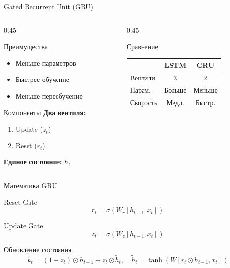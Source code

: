 \documentclass[aspectratio=169, 10pt]{beamer}
\begin{document}
\begin{frame}{Gated Recurrent Unit (GRU)}
  \begin{columns}[T]
    \begin{column}{0.45\textwidth}
      \begin{block}{Преимущества}
        \begin{itemize}
          \item Меньше параметров
          \item Быстрее обучение
          \item Меньше переобучение
        \end{itemize}
      \end{block}
      
      \vspace{0.2cm}
      
      \begin{block}{Компоненты}
        \textbf{Два вентиля:}
        \begin{enumerate}
          \item Update ($z_t$)
          \item Reset ($r_t$)
        \end{enumerate}
        
        \textbf{Единое состояние:} $h_t$       \end{block}
    \end{column}
    
    \begin{column}{0.45\textwidth}
      \begin{block}{Сравнение}
        \centering
        \small
        \begin{tabular}{lcc}
          \toprule
          & \textbf{LSTM} & \textbf{GRU} \\
          \midrule
          Вентили & 3 & 2 \\
          Парам. & Больше & Меньше \\
          Скорость & Медл. & Быстр. \\
          \bottomrule
        \end{tabular}
      \end{block}
    \end{column}
  \end{columns}
\end{frame}

\begin{frame}{Математика GRU}
  \begin{block}{Reset Gate}
    \[
      r_t = \sigma(W_r [h_{t-1}, x_t])
    \]
  \end{block}
  
  \begin{block}{Update Gate}
    \[
      z_t = \sigma(W_z [h_{t-1}, x_t])
    \]
  \end{block}
  
  \begin{block}{Обновление состояния}
    \[
      h_t = (1 - z_t) \odot h_{t-1} + z_t \odot \tilde{h}_t, \quad \tilde{h}_t = \tanh(W [r_t \odot h_{t-1}, x_t])
    \]
  \end{block}
\end{frame}
\end{document}
